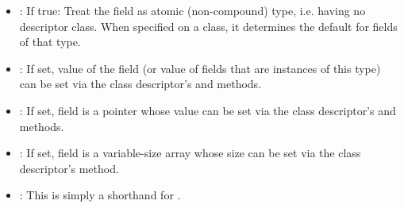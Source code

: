 \begin{itemize}

  \item {}: If true: Treat the field as atomic (non-compound) type, i.e.
    having no descriptor class. When specified on a class, it determines the default
    for fields of that type.

  \item {}: If set, value of the field (or value of fields that
    are instances of this type) can be set via the class descriptor's
     and  methods.

  \item {}: If set, field is a pointer whose value can be set
    via the class descriptor's  and
     methods.

  \item {}: If set, field is a variable-size array whose size
    can be set via the class descriptor's  method.

  \item {}: This is simply a shorthand for .

\end{itemize}
